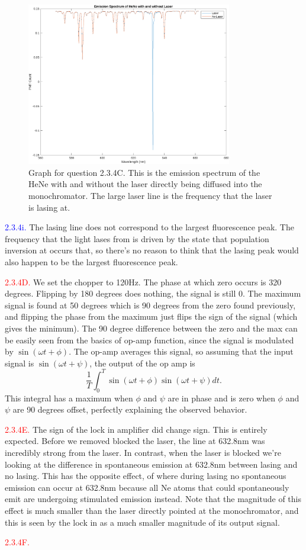 \documentclass[letterpaper, reqno,11pt]{article}
\begin{document}
\begin{figure}[htpb]
    \centering
    \includegraphics[width=0.8\textwidth]{4C}
    \caption{Graph for question 2.3.4C. This is the emission spectrum of the HeNe with and without the laser directly being diffused into the monochromator. The large laser line is the frequency that the laser is lasing at.}
    \label{fig:4C}
\end{figure}

\noindent \textcolor{blue}{2.3.4i.} The lasing line does not correspond to the largest fluorescence peak. The frequency that the light lases from is driven by the state that population inversion at occurs that, so there's no reason to think that the lasing peak would also happen to be the largest fluorescence peak.

\noindent \textcolor{red}{2.3.4D.} We set the chopper to 120Hz. The phase at which zero occurs is 320 degrees. Flipping by 180 degrees does nothing, the signal is still 0. The maximum signal is found at 50 degrees which is 90 degrees from the zero found previously, and flipping the phase from the maximum just flips the sign of the signal (which gives the minimum). The 90 degree difference between the zero and the max can be easily seen from the basics of op-amp function, since the signal is modulated by $\sin(\omega t+\phi)$. The op-amp averages this signal, so assuming that the input signal is $\sin(\omega t+\psi)$, the output of the op amp is
\[
\frac{1}{T}\int_{0}^{T}\sin(\omega t+\phi)\sin(\omega t+\psi)dt
.\]
This integral has a maximum when $\phi$ and $\psi$ are in phase and is zero when $\phi$ and $\psi$ are 90 degrees offset, perfectly explaining the observed behavior.

\noindent \textcolor{red}{2.3.4E.} The sign of the lock in amplifier did change sign. This is entirely expected. Before we removed blocked the laser, the line at 632.8nm was incredibly strong from the laser. In contrast, when the laser is blocked we're looking at the difference in spontaneous emission at 632.8nm between lasing and no lasing. This has the opposite effect, of where during lasing no spontaneous emission can occur at 632.8nm because all Ne atoms that could spontaneously emit are undergoing stimulated emission instead. Note that the magnitude of this effect is much smaller than the laser directly pointed at the monochromator, and this is seen by the lock in as a much smaller magnitude of its output signal.

\noindent \textcolor{red}{2.3.4F.}
\end{document}
